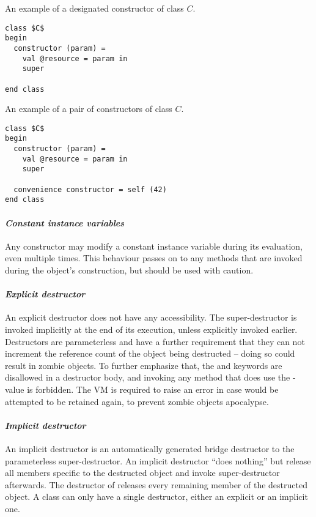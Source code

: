 \example An example of a designated constructor of class $C$.
\begin{lstlisting}
class $C$
begin
  constructor (param) =
    val @resource = param in
    super
    
end class
\end{lstlisting}

\example An example of a pair of constructors of class $C$. 
\begin{lstlisting}
class $C$
begin
  constructor (param) =
    val @resource = param in
    super
    
  convenience constructor = self (42)
end class
\end{lstlisting}

\paragraph{\em Constant instance variables}
Any constructor may modify a constant instance variable during its evaluation, even multiple times. This behaviour passes on to any methods that are invoked during the object's construction, but should be used with caution. 

\paragraph{\em Explicit destructor}
An explicit destructor does not have any accessibility. The super-destructor is invoked implicitly at the end of its execution, unless explicitly invoked earlier. Destructors are parameterless and have a further requirement that they can not increment the reference count of the object being destructed -- doing so could result in zombie objects. To further emphasize that, the  and  keywords are disallowed in a destructor body, and invoking any method that does use the -value is forbidden. The VM is required to raise an error in case  would be attempted to be retained again, to prevent zombie objects apocalypse. 

\paragraph{\em Implicit destructor}
An implicit destructor is an automatically generated bridge destructor to the parameterless super-destructor. An implicit destructor ``does nothing'' but release all members specific to the destructed object and invoke super-destructor afterwards. The destructor of  releases every remaining member of the destructed object. A class can only have a single destructor, either an explicit or an implicit one. 

